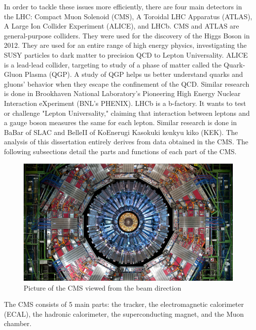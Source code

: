In order to tackle these issues more efficiently, there are four main detectors in the LHC: Compact Muon Solenoid (CMS), A Toroidal LHC Apparatus (ATLAS), A Large Ion Collider Experiment (ALICE), and LHCb.
CMS and ATLAS are general-purpose colliders. They were used for the discovery of the Higgs Boson in 2012. They are used for an entire range of high energy physics, investigating the SUSY particles to dark matter to precision QCD to Lepton Universality.
ALICE is a lead-lead collider, targeting to study of a phase of matter called the Quark-Gluon Plasma (QGP). A study of QGP helps us better understand quarks and gluons' behavior when they escape the confinement of the QCD.
Similar research is done in Brookhaven National Laboratory's Pioneering High Energy Nuclear Interaction eXperiment (BNL's PHENIX).
LHCb is a b-factory. It wants to test or challenge "Lepton Universality," claiming that interaction between leptons and a gauge boson measures the same for each lepton.
Similar research is done in BaBar of SLAC and BelleII of KoEnerugi Kasokuki kenkyu kiko (KEK).
The analysis of this dissertation entirely derives from data obtained in the CMS.
The following subsections detail the parts and functions of each part of the CMS.
\begin{figure}[h!]
	\caption{Picture of the CMS viewed from the beam direction \cite{det}}
  \label{fig:cms}
  \centering
  \includegraphics[width=1.0\linewidth]{figs/cms.png}
\end{figure}
The CMS consists of 5 main parts: the tracker, the electromagnetic calorimeter (ECAL), the hadronic calorimeter, the superconducting magnet, and the Muon chamber.
